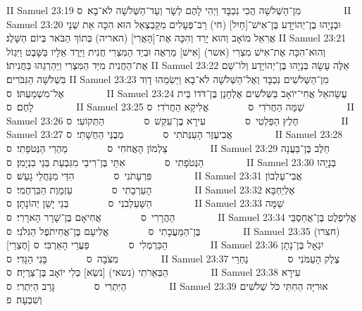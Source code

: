 II Samuel 23:19	מִן־הַשְּׁלֹשָׁה הֲכִי נִכְבָּד וַיְהִי לָהֶם לְשָׂר וְעַד־הַשְּׁלֹשָׁה לֹא־בָא׃ {ס}        
II Samuel 23:20	וּבְנָיָהוּ בֶן־יְהוֹיָדָע בֶּן־אִישׁ־[חַיִל] (חי) רַב־פְּעָלִים מִקַּבְצְאֵל הוּא הִכָּה אֵת שְׁנֵי אֲרִאֵל מוֹאָב וְהוּא יָרַד וְהִכָּה אֶת־[הָאֲרִי] (האריה) בְּתוֹךְ הַבֹּאר בְּיוֹם הַשָּׁלֶג׃
II Samuel 23:21	וְהוּא־הִכָּה אֶת־אִישׁ מִצְרִי (אשר) [אִישׁ] מַרְאֶה וּבְיַד הַמִּצְרִי חֲנִית וַיֵּרֶד אֵלָיו בַּשָּׁבֶט וַיִּגְזֹל אֶת־הַחֲנִית מִיַּד הַמִּצְרִי וַיַּהַרְגֵהוּ בַּחֲנִיתוֹ׃
II Samuel 23:22	אֵלֶּה עָשָׂה בְּנָיָהוּ בֶּן־יְהוֹיָדָע וְלוֹ־שֵׁם בִּשְׁלֹשָׁה הַגִּבֹּרִים׃
II Samuel 23:23	מִן־הַשְּׁלֹשִׁים נִכְבָּד וְאֶל־הַשְּׁלֹשָׁה לֹא־בָא וַיְשִׂמֵהוּ דָוִד אֶל־מִשְׁמַעְתּוֹ׃ {ס}        
II Samuel 23:24	עֲשָׂהאֵל אֲחִי־יוֹאָב בַּשְּׁלֹשִׁים אֶלְחָנָן בֶּן־דֹּדוֹ בֵּית לָחֶם׃ {ס}        
II Samuel 23:25	שַׁמָּה הַחֲרֹדִי {ס}        אֱלִיקָא הַחֲרֹדִי׃ {ס}        
II Samuel 23:26	חֶלֶץ הַפַּלְטִי {ס}        עִירָא בֶן־עִקֵּשׁ {ס}        הַתְּקוֹעִי׃ {ס}        
II Samuel 23:27	אֲבִיעֶזֶר הָעַנְּתֹתִי {ס}        מְבֻנַּי הַחֻשָׁתִי׃ {ס}        
II Samuel 23:28	צַלְמוֹן הָאֲחֹחִי {ס}        מַהְרַי הַנְּטֹפָתִי׃ {ס}        
II Samuel 23:29	חֵלֶב בֶּן־בַּעֲנָה הַנְּטֹפָתִי {ס}        אִתַּי בֶּן־רִיבַי מִגִּבְעַת בְּנֵי בִנְיָמִן׃ {ס}        
II Samuel 23:30	בְּנָיָהוּ פִּרְעָתֹנִי {ס}        הִדַּי מִנַּחֲלֵי גָעַשׁ׃ {ס}        
II Samuel 23:31	אֲבִי־עַלְבוֹן הָעַרְבָתִי {ס}        עַזְמָוֶת הַבַּרְחֻמִי׃ {ס}        
II Samuel 23:32	אֶלְיַחְבָּא הַשַּׁעַלְבֹנִי {ס}        בְּנֵי יָשֵׁן יְהוֹנָתָן׃ {ס}        
II Samuel 23:33	שַׁמָּה הַהֲרָרִי {ס}        אֲחִיאָם בֶּן־שָׁרָר הָארָרִי׃ {ס}        
II Samuel 23:34	אֱלִיפֶלֶט בֶּן־אֲחַסְבַּי בֶּן־הַמַּעֲכָתִי {ס}        אֱלִיעָם בֶּן־אֲחִיתֹפֶל הַגִּלֹנִי׃ {ס}        
II Samuel 23:35	(חצרו) [חֶצְרַי] הַכַּרְמְלִי {ס}        פַּעֲרַי הָאַרְבִּי׃ {ס}        
II Samuel 23:36	יִגְאָל בֶּן־נָתָן מִצֹּבָה {ס}        בָּנִי הַגָּדִי׃ {ס}        
II Samuel 23:37	צֶלֶק הָעַמֹּנִי {ס}        נַחְרַי הַבְּאֵרֹתִי (נשאי) [נֹשֵׂא] כְּלֵי יוֹאָב בֶּן־צְרֻיָה׃ {ס}        
II Samuel 23:38	עִירָא הַיִּתְרִי {ס}        גָּרֵב הַיִּתְרִי׃ {ס}        
II Samuel 23:39	אוּרִיָּה הַחִתִּי כֹּל שְׁלֹשִׁים וְשִׁבְעָה׃ {פ}
